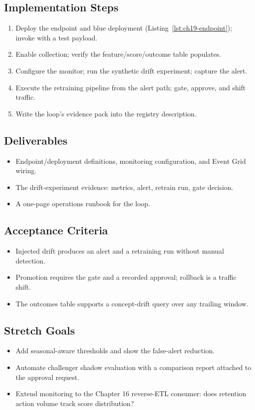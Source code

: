 \subsection*{Implementation Steps}
\begin{enumerate}
    \item Deploy the endpoint and blue deployment (Listing~\ref{lst:ch19-endpoint}); invoke with a test payload.
    \item Enable collection; verify the feature/score/outcome table populates.
    \item Configure the monitor; run the synthetic drift experiment; capture the alert.
    \item Execute the retraining pipeline from the alert path; gate, approve, and shift traffic.
    \item Write the loop's evidence pack into the registry description.
\end{enumerate}

\subsection*{Deliverables}
\begin{itemize}
    \item Endpoint/deployment definitions, monitoring configuration, and Event Grid wiring.
    \item The drift-experiment evidence: metrics, alert, retrain run, gate decision.
    \item A one-page operations runbook for the loop.
\end{itemize}

\subsection*{Acceptance Criteria}
\begin{itemize}
    \item Injected drift produces an alert and a retraining run without manual detection.
    \item Promotion requires the gate and a recorded approval; rollback is a traffic shift.
    \item The outcomes table supports a concept-drift query over any trailing window.
\end{itemize}

\subsection*{Stretch Goals}
\begin{itemize}
    \item Add seasonal-aware thresholds and show the false-alert reduction.
    \item Automate challenger shadow evaluation with a comparison report attached to the approval request.
    \item Extend monitoring to the Chapter 16 reverse-ETL consumer: does retention action volume track score distribution?
\end{itemize}
